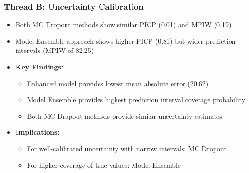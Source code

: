 \documentclass{beamer}
\begin{document}
\begin{frame}
  \frametitle{Thread B: Uncertainty Calibration}
  \begin{itemize}
    \item Both MC Dropout methods show similar PICP (0.01) and MPIW (0.19)
    \item Model Ensemble approach shows higher PICP (0.81) but wider prediction intervals (MPIW of 82.25)
    \item \textbf{Key Findings:}
    \begin{itemize}
      \item Enhanced model provides lowest mean absolute error (20.62)
      \item Model Ensemble provides highest prediction interval coverage probability
      \item Both MC Dropout methods provide similar uncertainty estimates
    \end{itemize}
    \item \textbf{Implications:}
    \begin{itemize}
      \item For well-calibrated uncertainty with narrow intervals: MC Dropout
      \item For higher coverage of true values: Model Ensemble
    \end{itemize}
  \end{itemize}
\end{frame}
\end{document}
